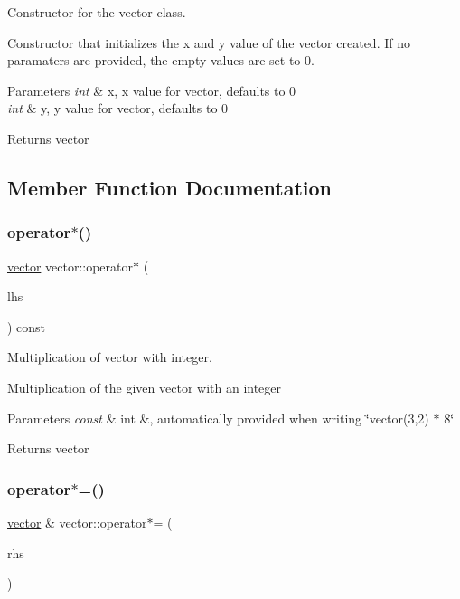Constructor for the vector class. 

Constructor that initializes the x and y value of the vector created. If no paramaters are provided, the empty values are set to 0. 
\begin{DoxyParams}{Parameters}
{\em int} & x, x value for vector, defaults to 0 \\
\hline
{\em int} & y, y value for vector, defaults to 0 \\
\hline
\end{DoxyParams}
\begin{DoxyReturn}{Returns}
vector 
\end{DoxyReturn}


\subsection{Member Function Documentation}
\mbox{\label{classvector_a45eb0f7dc223ac58649ab466d961c547}} 
\subsubsection{\texorpdfstring{operator$\ast$()}{operator*()}}
{\footnotesize\ttfamily \hyperlink{classvector}{vector} vector\+::operator$\ast$ (\begin{DoxyParamCaption}\item[{const int \&}]{lhs }\end{DoxyParamCaption}) const}



Multiplication of vector with integer. 

Multiplication of the given vector with an integer 
\begin{DoxyParams}{Parameters}
{\em const} & int \&, automatically provided when writing \char`\"{}vector(3,2) $\ast$ 8\char`\"{} \\
\hline
\end{DoxyParams}
\begin{DoxyReturn}{Returns}
vector 
\end{DoxyReturn}
\mbox{\label{classvector_ad1d720c7cd340d051ff39a31f95995f7}} 
\subsubsection{\texorpdfstring{operator$\ast$=()}{operator*=()}}
{\footnotesize\ttfamily \hyperlink{classvector}{vector} \& vector\+::operator$\ast$= (\begin{DoxyParamCaption}\item[{const int}]{rhs }\end{DoxyParamCaption})}



